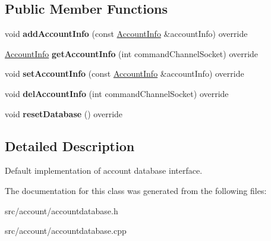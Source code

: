 \subsection*{Public Member Functions}
\begin{DoxyCompactItemize}
\item 
\mbox{\label{classAccountDatabaseDefault_a1ec811d4b91f7a50173d4febd4b288df}} 
void {\bfseries add\+Account\+Info} (const \hyperlink{classAccountInfo}{Account\+Info} \&account\+Info) override
\item 
\mbox{\label{classAccountDatabaseDefault_a2f927b06f1794578d5f4fe919dd8f760}} 
\hyperlink{classAccountInfo}{Account\+Info} {\bfseries get\+Account\+Info} (int command\+Channel\+Socket) override
\item 
\mbox{\label{classAccountDatabaseDefault_a272c8d7c00deffd4823245ae4843e1e6}} 
void {\bfseries set\+Account\+Info} (const \hyperlink{classAccountInfo}{Account\+Info} \&account\+Info) override
\item 
\mbox{\label{classAccountDatabaseDefault_a0e3f47244d8cc41d976ebc53bb4910a7}} 
void {\bfseries del\+Account\+Info} (int command\+Channel\+Socket) override
\item 
\mbox{\label{classAccountDatabaseDefault_af4bac6718adab77d641035bbfadb981b}} 
void {\bfseries reset\+Database} () override
\end{DoxyCompactItemize}


\subsection{Detailed Description}
Default implementation of account database interface. 

The documentation for this class was generated from the following files\+:\begin{DoxyCompactItemize}
\item 
src/account/accountdatabase.\+h\item 
src/account/accountdatabase.\+cpp\end{DoxyCompactItemize}
